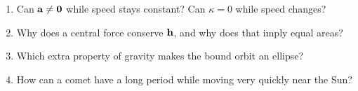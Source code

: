 \documentclass[11pt,letterpaper]{article}
\newcommand{\heading}[1]{\vspace{3pt}{\large\bfseries #1}\par}
\begin{document}
\heading{Questions to close the lecture}
\begin{enumerate}[itemsep=3pt]
 \item Can $\mathbf a\ne\mathbf0$ while speed stays constant? Can $\kappa=0$ while speed changes?
 \item Why does a central force conserve $\mathbf h$, and why does that imply equal areas?
 \item Which extra property of gravity makes the bound orbit an ellipse?
 \item How can a comet have a long period while moving very quickly near the Sun?
\end{enumerate}
\end{document}
